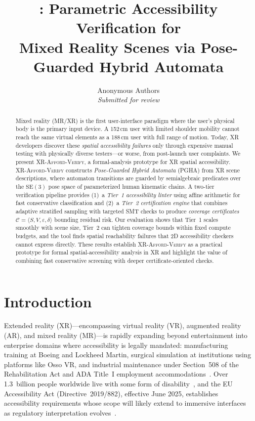 \documentclass[11pt,letterpaper]{article}
\title{\tool{}: Parametric Accessibility Verification for\\Mixed Reality Scenes via Pose-Guarded Hybrid Automata}
\author{
  Anonymous Authors\\
  \textit{Submitted for review}
}
\date{}
\newcommand{\tool}{\textsc{XR-Afford-Verify}}
\newcommand{\SE}{\mathrm{SE}(3)}
\newcommand{\eps}{\varepsilon}
\newcommand{\cert}{\mathcal{C}}
\begin{document}
\maketitle

\begin{abstract}
Mixed reality (MR/XR) is the first user-interface paradigm where the user's physical body is the primary input device.
A 152\,cm user with limited shoulder mobility cannot reach the same virtual elements as a 188\,cm user with full range of motion.
Today, XR developers discover these \emph{spatial accessibility failures} only through expensive manual testing with physically diverse testers---or worse, from post-launch user complaints.
We present \tool{}, a formal-analysis prototype for XR spatial accessibility.
\tool{} constructs \emph{Pose-Guarded Hybrid Automata} (PGHA) from XR scene descriptions, where automaton transitions are guarded by semialgebraic predicates over the $\SE$ pose space of parameterized human kinematic chains.
A two-tier verification pipeline provides (1)~a \emph{Tier~1 accessibility linter} using affine arithmetic for fast conservative classification and (2)~a \emph{Tier~2 certification engine} that combines adaptive stratified sampling with targeted SMT checks to produce \emph{coverage certificates} $\cert = \langle S, V, \eps, \delta \rangle$ bounding residual risk.
Our evaluation shows that Tier~1 scales smoothly with scene size, Tier~2 can tighten coverage bounds within fixed compute budgets, and the tool finds spatial reachability failures that 2D accessibility checkers cannot express directly. These results establish \tool{} as a practical prototype for formal spatial-accessibility analysis in XR and highlight the value of combining fast conservative screening with deeper certificate-oriented checks.
\end{abstract}

\section{Introduction}
\label{sec:intro}

Extended reality (XR)---encompassing virtual reality (VR), augmented reality (AR), and mixed reality (MR)---is rapidly expanding beyond entertainment into enterprise domains where accessibility is legally mandated: manufacturing training at Boeing and Lockheed Martin, surgical simulation at institutions using platforms like Osso VR, and industrial maintenance under Section~508 of the Rehabilitation Act and ADA Title~I employment accommodations~\cite{section508,ada}.
Over 1.3~billion people worldwide live with some form of disability~\cite{who2023}, and the EU Accessibility Act (Directive~2019/882), effective June 2025, establishes accessibility requirements whose scope will likely extend to immersive interfaces as regulatory interpretation evolves~\cite{eaa2019}.
\end{document}
